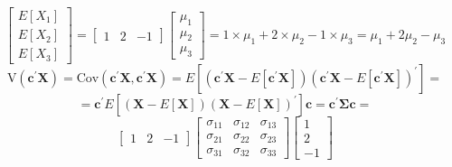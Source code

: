 \begin{enumerate}[label=(\alph*)]
\[                \begin{bmatrix}
                    E\left[X_1\right] \\
                    E\left[X_2\right] \\
                    E\left[X_3\right]
                \end{bmatrix}
                =
                \begin{bmatrix}
                    1 & 2 & -1
                \end{bmatrix}                
                \begin{bmatrix}
                    \mu_1 \\
                    \mu_2 \\
                    \mu_3
                \end{bmatrix}
                =
                1 \times \mu_1 + 2 \times \mu_2 - 1 \times \mu_3
                =
                \mu_1 + 2 \mu_2  - \mu_3
            \]
            \[
                \text{V}\left(\textbf{c}^\prime\textbf{X}\right)
                =
                \text{Cov}\left(\textbf{c}^\prime\textbf{X},\textbf{c}^\prime\textbf{X}\right)
                =
                E\left[\left(\textbf{c}^\prime\textbf{X} - E\left[\textbf{c}^\prime\textbf{X}\right]\right)\left(\textbf{c}^\prime\textbf{X} - E\left[\textbf{c}^\prime\textbf{X}\right]\right)^\prime\right]
                =
            \]
            \[
                =
                \textbf{c}^\prime E\left[\left(\textbf{X} - E\left[\textbf{X}\right]\right){\left(\textbf{X} - E\left[\textbf{X}\right]\right)}^\prime\right]\textbf{c}
                =
                \textbf{c}^\prime\mathbf{\Sigma}\textbf{c}
                =
            \]
            \[
                \begin{bmatrix}
                    1 & 2 & -1
                \end{bmatrix}
                \begin{bmatrix}
                    \sigma_{11} & \sigma_{12} & \sigma_{13} \\
                    \sigma_{21} & \sigma_{22} & \sigma_{23} \\
                    \sigma_{31} & \sigma_{32} & \sigma_{33}
                \end{bmatrix}
                \begin{bmatrix}
                    1 \\
                    2 \\
                    -1
                \end{bmatrix}
\]
\end{enumerate}
